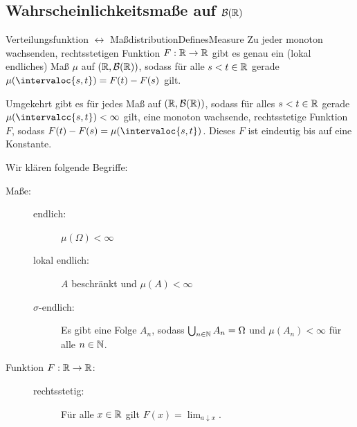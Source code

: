 \documentclass[language=ngerman]{../../Template/TemplateLecture}
\begin{document}
\subsection{Wahrscheinlichkeitsmaße auf $\mathcal{B}(\mathbb{R})$}

\begin{thm}{Verteilungsfunktion $\leftrightarrow$ Maß}{distributionDefinesMeasure}
    Zu jeder monoton wachsenden, rechtsstetigen Funktion $F: \mathbb{R} \to \mathbb{R}$ gibt es genau ein (lokal endliches) Maß $\mu$ auf $(\mathbb{R}, \mathcal{B}(\mathbb{R}))$, sodass für alle $s < t \in \mathbb{R}$ gerade $\mu(\intervaloc{s,t}) = F(t) - F(s)$ gilt.

    Umgekehrt gibt es für jedes Maß auf $(\mathbb{R}, \mathcal{B}(\mathbb{R}))$, sodass für alles $s < t \in \mathbb{R}$ gerade $\mu(\intervalcc{s,t}) < \infty$ gilt, eine monoton wachsende, rechtsstetige Funktion $F$, sodass $F(t) - F(s) = \mu(\intervaloc{s,t})$. Dieses $F$ ist eindeutig bis auf eine Konstante.
\end{thm}

\begin{bemerkung}
    Wir klären folgende Begriffe:
    \begin{description}
        \item[Maße:] \begin{description}
            \item[endlich:] $\mu(\Omega) < \infty$
            \item[lokal endlich:] $A$ beschränkt und $\mu(A) < \infty$
            \item[$\sigma$-endlich:] Es gibt eine Folge $A_n$, sodass $\bigcup_{n \in \mathbb{N}} A_n = \Omega$ und $\mu(A_n) < \infty$ für alle $n \in \mathbb{N}$.
        \end{description}
        \item[Funktion $F: \mathbb{R} \to \mathbb{R}$:] \begin{description}
            \item[rechtsstetig:] Für alle $x \in \mathbb{R}$ gilt $F(x) = \lim_{a \downarrow x}$.
        \end{description}
    \end{description}
\end{bemerkung}


\end{document}

